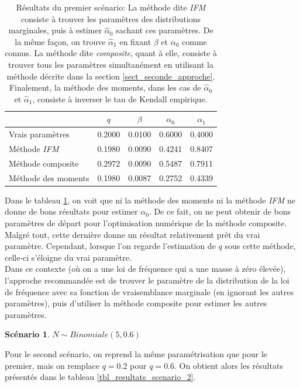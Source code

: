 \documentclass[11pt]{article}
\newtheorem{scenario}{Scénario}
\begin{document}
 		\begin{table}[H]
 			\centering
 			\begin{tabular}{lcccc}
 				\hline
 				& $q$ & $\beta$ & $\alpha_0$ & $\alpha_1$ \\ 
 				\hline
 				Vrais paramètres & 0.2000 & 0.0100 & 0.6000 & 0.4000  \\ 
 				Méthode \textit{IFM} & 0.1980 & 0.0090 & 0.4241 & 0.8407  \\ 
 				Méthode composite & 0.2972 & 0.0090 & 0.5487 & 0.7911 \\ 
 				Méthode des moments & 0.1980 & 0.0087 & 0.2752 & 0.4339 \\ 
 				\hline
 			\end{tabular}
 			\caption[Résultats du premier scénario.]{Résultats du premier scénario: La méthode dite \textit{IFM} consiste à trouver les paramètres des distributions marginales, puis à estimer $\hat{\alpha}_{0}$ sachant ces paramètres. De la même façon, on trouve $\hat{\alpha}_{1}$ en fixant $\beta$ et $\alpha_{0}$ comme connus. La méthode dite \textit{composite}, quant à elle, consiste à trouver tous les paramètres simultanément en utilisant la méthode décrite dans la section \ref{sect_seconde_approche}. Finalement, la méthode des moments, dans les cas de $\hat{\alpha}_{0}$ et $\hat{\alpha}_{1}$, consiste à inverser le tau de Kendall empirique.}
 			\label{tbl_resultats_scenario_1}
 		\end{table}
 	
 	Dans le tableau \ref{tbl_resultats_scenario_1}, on voit que ni la méthode des moments ni la méthode \textit{IFM} ne donne de bons résultats pour estimer $\alpha_0$. De ce fait, on ne peut obtenir de bons paramètres de départ pour l'optimisation numérique de la méthode composite. Malgré tout, cette dernière donne un résultat relativement prêt du vrai paramètre. Cependant, lorsque l'on regarde l'estimation de $q$ sous cette méthode, celle-ci s'éloigne du vrai paramètre.\\
 	
 	Dans ce contexte (où on a une loi de fréquence qui a une masse à zéro élevée), l'approche recommandée est de trouver le paramètre de la distribution de la loi de fréquence avec sa fonction de vraisemblance marginale (en ignorant les autres paramètres), puis d'utiliser la méthode composite pour estimer les autres paramètres.
 	
 	 \begin{scenario}
 		\textbf{$N \sim Binomiale(5, 0.6)$}
 	\end{scenario}
 		Pour le second scénario, on reprend la même paramétrisation que pour le premier, mais on remplace $q=0.2$ pour $q=0.6$.
 		On obtient alors les résultats présentés dans le tableau \ref{tbl_resultats_scenario_2}.
 	
\end{document}
